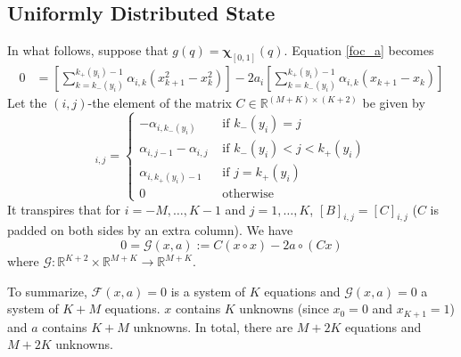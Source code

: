 \documentclass[12pt]{article}
\begin{document}
\subsection{Uniformly Distributed State}
In what follows, suppose that $g(q)=\mathbf{\chi}_{[0,1]}(q)$. Equation \ref{foc_a} becomes
\begin{align}
	0&=\left[\sum_{k=k_{-}(y_{i})}^{k_{+}(y_{i})-1}{\alpha_{i,k}\left(x_{k+1}^{2}-x_{k}^{2}\right)}\right]-2a_{i}\left[\sum_{k=k_{-}(y_{i})}^{k_{+}(y_{i})-1}{\alpha_{i,k}(x_{k+1}-x_{k})}\right]
\end{align}
Let the $(i,j)$-the element of the matrix $C\in\mathbb{R}^{(M+K)\times(K+2)}$ be given by
\begin{equation}
	[C]_{i,j}=
	\begin{cases}
		-\alpha_{i,k_{-}(y_{i})} & \text{ if } k_{-}(y_{i})=j \\
		\alpha_{i,j-1}-\alpha_{i,j} & \text{ if } k_{-}(y_{i})<j<k_{+}(y_{i})\\
		\alpha_{i,k_{+}(y_{i})-1} & \text{ if } j=k_{+}(y_{i})\\
		0 & \text{ otherwise }
	\end{cases}
\end{equation}
It transpires that for $i=-M,\ldots,K-1$ and $j=1,\ldots,K$, $[B]_{i,j}=[C]_{i,j}$ ($C$ is padded on both sides by an extra column). We have 
\begin{equation}\label{eq:G_map}
	0=\mathcal{G}(x,a):=C(x\circ x)-2a\circ (Cx)
\end{equation}
where $\mathcal{G}:\mathbb{R}^{K+2}\times\mathbb{R}^{M+K}\rightarrow\mathbb{R}^{M+K}$. 

To summarize, $\mathcal{F}(x,a)=0$ is a system of $K$ equations and $\mathcal{G}(x,a)=0$ a system of $K+M$ equations. $x$ contains $K$ unknowns (since $x_{0}=0$ and $x_{K+1}=1$) and $a$ contains $K+M$ unknowns. In total, there are $M+2K$ equations and $M+2K$ unknowns. 
\end{document}
